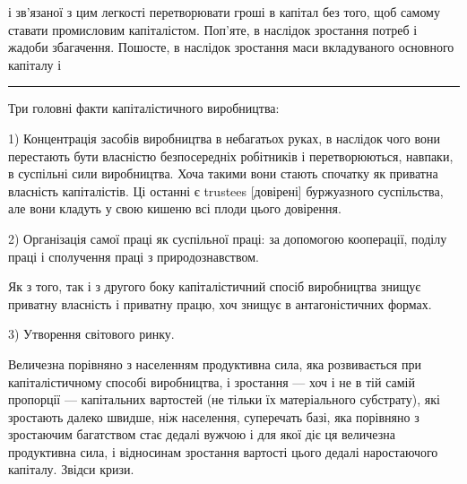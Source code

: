\parcont{}  %
і зв’язаної з цим легкості перетворювати гроші в капітал без того,
щоб самому ставати промисловим капіталістом. Поп’яте, в наслідок
зростання потреб і жадоби збагачення. Пошосте, в наслідок
зростання маси вкладуваного основного капіталу і~

\pfbreak{}

Три головні факти капіталістичного виробництва:

1) Концентрація засобів виробництва в небагатьох руках,
в наслідок чого вони перестають бути власністю безпосередніх
робітників і перетворюються, навпаки, в суспільні сили виробництва.
Хоча такими вони стають спочатку як приватна власність
капіталістів. Ці останні є trustees [довірені] буржуазного суспільства,
але вони кладуть у свою кишеню всі плоди цього довірення.

2) Організація самої праці як суспільної праці: за допомогою
кооперації, поділу праці і сполучення праці з природознавством.

Як з того, так і з другого боку капіталістичний спосіб виробництва
знищує приватну власність і приватну працю, хоч
знищує в антагоністичних формах.

3) Утворення світового ринку.

Величезна порівняно з населенням продуктивна сила, яка розвивається
при капіталістичному способі виробництва, і зростання
— хоч і не в тій самій пропорції — капітальних вартостей
(не тільки їх матеріального субстрату), які зростають далеко
швидше, ніж населення, суперечать базі, яка порівняно з зростаючим
багатством стає дедалі вужчою і для якої діє ця величезна
продуктивна сила, і відносинам зростання вартості цього
дедалі наростаючого капіталу. Звідси кризи.

